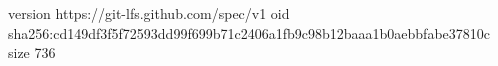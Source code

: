version https://git-lfs.github.com/spec/v1
oid sha256:cd149df3f5f72593dd99f699b71c2406a1fb9c98b12baaa1b0aebbfabe37810c
size 736
